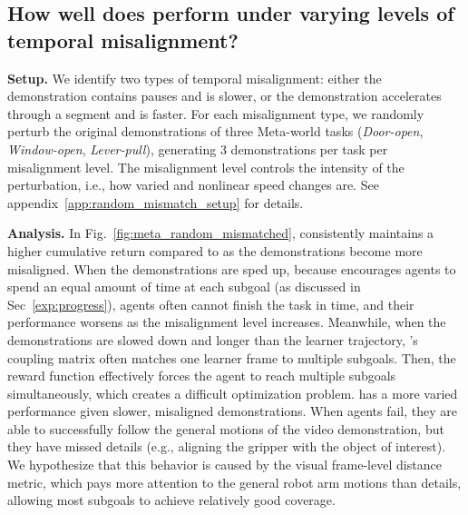 
\subsection{How well does \orca{} perform under varying levels of temporal misalignment?\label{sec:exp_random_mismatched}}
\textbf{Setup.} 
We identify two types of temporal misalignment: either the demonstration contains pauses and is slower, or the demonstration accelerates through a segment and is faster.
For each misalignment type, we randomly perturb the original demonstrations of three Meta-world tasks (\textit{Door-open}, \textit{Window-open}, \textit{Lever-pull}), generating 3 demonstrations per task per misalignment level.
The misalignment level controls the intensity of the perturbation, i.e., how varied and nonlinear speed changes are. 
See appendix~\ref{app:random_mismatch_setup} for details.

\textbf{Analysis.}
In Fig.~\ref{fig:meta_random_mismatched}, \orca{} consistently maintains a higher cumulative return compared to \tot{} as the demonstrations become more misaligned. 
When the demonstrations are sped up, because \tot{} encourages agents to spend an equal amount of time at each subgoal (as discussed in Sec~\ref{exp:progress}), \tot{} agents often cannot finish the task in time, and their performance worsens as the misalignment level increases. 
Meanwhile, when the demonstrations are slowed down and longer than the learner trajectory, \tot{}'s coupling matrix often matches one learner frame to multiple subgoals. 
Then, the \tot{} reward function effectively forces the agent to reach multiple subgoals simultaneously, which creates a difficult optimization problem. 
\orca{} has a more varied performance given slower, misaligned demonstrations. 
When \orca{} agents fail, they are able to successfully follow the general motions of the video demonstration, but they have missed details (e.g., aligning the gripper with the object of interest). 
We hypothesize that this behavior is caused by the visual frame-level distance metric, which pays more attention to the general robot arm motions than details, allowing most subgoals to achieve relatively good coverage. 
